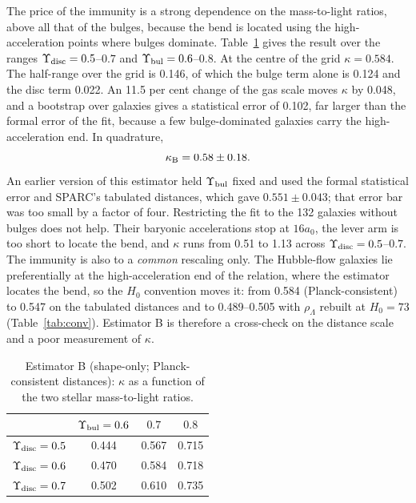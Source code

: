 \documentclass[fleqn,usenatbib]{mnras}
\newif\ifpapersix
\begin{document}
The price of the immunity is a strong dependence on the mass-to-light ratios, above all that of the bulges, because the bend is located using the high-acceleration points where bulges dominate. Table~\ref{tab:shape} gives the result over the ranges $\Upsilon_{\rm disc}=0.5$--$0.7$ and $\Upsilon_{\rm bul}=0.6$--$0.8$. At the centre of the grid $\kappa=0.584$. The half-range over the grid is 0.146, of which the bulge term alone is 0.124 and the disc term 0.022. An 11.5 per cent change of the gas scale moves $\kappa$ by 0.048, and a bootstrap over galaxies gives a statistical error of 0.102, far larger than the formal error of the fit, because a few bulge-dominated galaxies carry the high-acceleration end. In quadrature,
\begin{equation}
\kappa_{\rm B}=0.58\pm0.18 .
\label{eq:kappaB}
\end{equation}
\ifpapersix An earlier version of this estimator held $\Upsilon_{\rm bul}$ fixed, used the formal statistical error and SPARC's tabulated distances, which gave $0.551\pm0.043$ \citep{Zimmerman2026kappa}; that error bar was too small by a factor of four. (The four-form section of that note is superseded.) \else An earlier version of this estimator held $\Upsilon_{\rm bul}$ fixed and used the formal statistical error and SPARC's tabulated distances, which gave $0.551\pm0.043$; that error bar was too small by a factor of four. \fi Restricting the fit to the 132 galaxies without bulges does not help. Their baryonic accelerations stop at $16a_0$, the lever arm is too short to locate the bend, and $\kappa$ runs from 0.51 to 1.13 across $\Upsilon_{\rm disc}=0.5$--$0.7$. The immunity is also to a \emph{common} rescaling only. The Hubble-flow galaxies lie preferentially at the high-acceleration end of the relation, where the estimator locates the bend, so the $H_0$ convention moves it: from 0.584 (Planck-consistent) to 0.547 on the tabulated distances and to 0.489--0.505 with $\rho_\Lambda$ rebuilt at $H_0=73$ (Table~\ref{tab:conv}). Estimator B is therefore a cross-check on the distance scale and a poor measurement of $\kappa$.

\begin{table}
\caption{Estimator B (shape-only; Planck-consistent distances): $\kappa$ as a function of the two stellar mass-to-light ratios.}
\label{tab:shape}
\begin{tabular}{lccc}
\toprule
 & $\Upsilon_{\rm bul}=0.6$ & $0.7$ & $0.8$\\
\midrule
$\Upsilon_{\rm disc}=0.5$ & 0.444 & 0.567 & 0.715\\
$\Upsilon_{\rm disc}=0.6$ & 0.470 & 0.584 & 0.718\\
$\Upsilon_{\rm disc}=0.7$ & 0.502 & 0.610 & 0.735\\
\bottomrule
\end{tabular}
\end{table}
\end{document}
